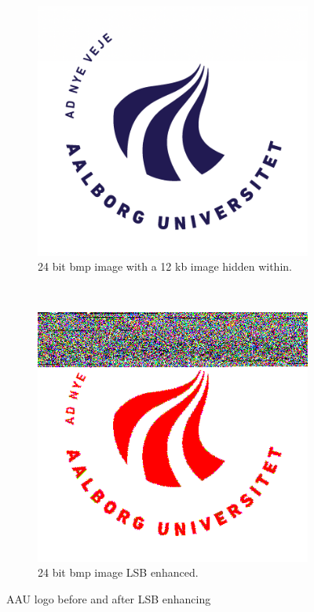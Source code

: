 \begin{figure}
    \centering
    \begin{subfigure}[b]{0.45\textwidth}
		\includegraphics[width=\textwidth]{figures/StegoAAU.png}
		\caption{24 bit bmp image with a 12 kb image hidden within.}
		\label{fig:hiddenAAU}
	\end{subfigure}
	~
	\begin{subfigure}[b]{0.45\textwidth}
		\includegraphics[width=\textwidth]{figures/StegoAAULSB.png}
		\caption{24 bit bmp image LSB enhanced.}
		\label{fig:LSBenhanced}
	\end{subfigure}
	\caption{AAU logo before and after LSB enhancing}
\end{figure}


